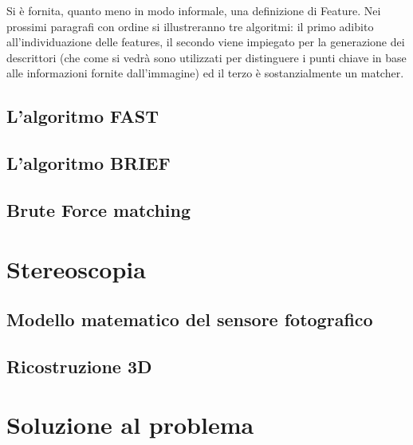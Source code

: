 Si è fornita, quanto meno in modo informale, una definizione di Feature. Nei prossimi paragrafi con ordine si illustreranno tre algoritmi: il primo adibito all'individuazione delle features, il secondo viene impiegato per la generazione dei descrittori (che come si vedrà sono utilizzati per distinguere i punti chiave in base alle informazioni fornite dall'immagine) ed il terzo è sostanzialmente un matcher. 



\subsection{L'algoritmo FAST}
\label{sec:det:fast}

\subsection{L'algoritmo BRIEF}
\label{sec:det:brief}

\subsection{Brute Force matching}
\label{sec:det:bmmatch}


\section{Stereoscopia}
\label{sec:stereo}




\subsection{Modello matematico del sensore fotografico}
\label{sec:stereo:modello}


\subsection{Ricostruzione 3D}
\label{sec:stereo:ric3d}


\section{Soluzione al problema}
\label{sec:vision:solution}


